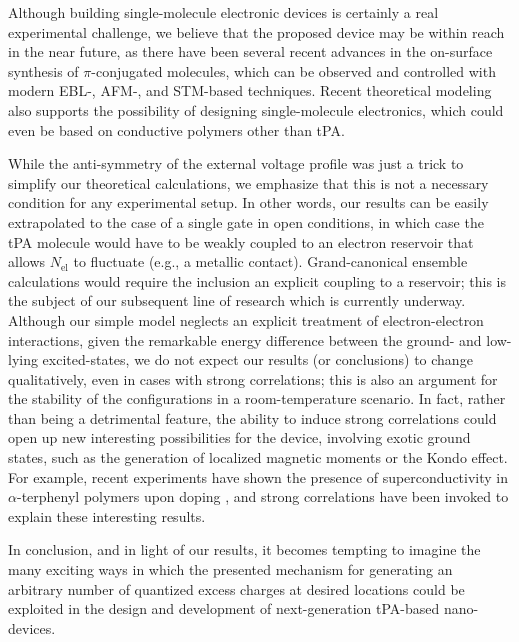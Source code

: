 \documentclass[10pt,a4paper]{article}
\begin{document}
Although building single-molecule electronic devices is certainly a real experimental challenge, we believe that the proposed device may be within reach in the near future, as there have been several recent advances in the on-surface synthesis of $\pi$-conjugated molecules\cite{Grill2007, Shen17_Frontiers_on_surface_review,Han21_Surface_assisted_fabrication_low_dimensional_carbon_nanostructures}, which can be observed and controlled with modern EBL-, AFM-, and STM-based techniques\cite{Wang19_Solitons_in_individual_PA_molecules}. Recent theoretical modeling also supports the possibility of designing single-molecule electronics\cite{Yao19_Unconventional_nanofabrication_supramolecular_electronics}, which could even be based on conductive polymers other than tPA\cite{cirera2020tailoring}.

While the anti-symmetry of the external voltage profile was just a trick to simplify our theoretical calculations, we emphasize that this is not a necessary condition for any experimental setup. In other words, our results can be easily extrapolated to the case of a single gate in open conditions, in which case the tPA molecule would have to be weakly coupled to an electron reservoir that allows $N_\text{el}$ to fluctuate (e.g., a metallic contact). Grand-canonical ensemble calculations would require the inclusion an explicit coupling to a reservoir; this is the subject of our subsequent line of research which is currently underway. Although our simple model neglects an explicit treatment of electron-electron interactions, given the remarkable energy difference between the ground- and low-lying excited-states, we do not expect our results (or conclusions) to change qualitatively, even in cases with strong correlations; this is also an argument for the stability of the configurations in a room-temperature scenario. In fact, rather than being a detrimental feature, the ability to induce strong correlations could open up new interesting possibilities for the device, involving exotic ground states, such as the generation of localized magnetic moments or the Kondo effect. For example, recent experiments have shown the presence of superconductivity in $\alpha$-terphenyl polymers upon doping \cite{Zhong18_Superconductivity_in_p_terphenyl, Yan19_Superconductivity_in_p_quaterphenyl, Huang19_Superconductivity_in_p_terphenyl}
, and strong correlations have been invoked to explain these interesting results.

In conclusion, and in light of our results, it becomes tempting to imagine the many exciting ways in which the presented mechanism for generating an arbitrary number of quantized excess charges at desired locations could be exploited in the design and development of next-generation tPA-based nano-devices.
\end{document}
